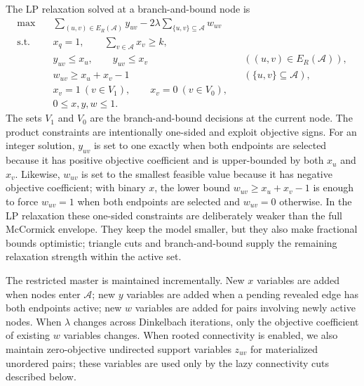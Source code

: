\documentclass[12pt]{article}
\newcommand{\A}{\mathcal{A}}
\begin{document}
The LP relaxation solved at a branch-and-bound node is
\begin{equation}
  \label{eq:rmp}
  \begin{aligned}
    \max\quad            & \sum_{(u,v)\in E_R(\A)} y_{uv}
    -2\lambda\sum_{\{u,v\}\subseteq\A} w_{uv}                                                           \\
    \text{s.t.}\quad
                         & x_q=1,
    \qquad \sum_{v\in\A}x_v\ge k,                                                                       \\
                         & y_{uv}\le x_u,
    \qquad y_{uv}\le x_v &                                & ((u,v)\in E_R(\A)),                         \\
                         & w_{uv}\ge x_u+x_v-1            &                     & (\{u,v\}\subseteq\A), \\
                         & x_v=1\ (v\in V_1),
    \qquad x_v=0\ (v\in V_0),                                                                           \\
                         & 0\le x,y,w\le 1.
  \end{aligned}
\end{equation}
The sets $V_1$ and $V_0$ are the branch-and-bound decisions at the current node.  The product constraints are intentionally one-sided and exploit objective signs.  For an integer solution, $y_{uv}$ is set to one exactly when both endpoints are selected because it has positive objective coefficient and is upper-bounded by both $x_u$ and $x_v$.  Likewise, $w_{uv}$ is set to the smallest feasible value because it has negative objective coefficient; with binary $x$, the lower bound $w_{uv}\ge x_u+x_v-1$ is enough to force $w_{uv}=1$ when both endpoints are selected and $w_{uv}=0$ otherwise.  In the LP relaxation these one-sided constraints are deliberately weaker than the full McCormick envelope.  They keep the model smaller, but they also make fractional bounds optimistic; triangle cuts and branch-and-bound supply the remaining relaxation strength within the active set.

The restricted master is maintained incrementally.  New $x$ variables are added when nodes enter $\A$; new $y$ variables are added when a pending revealed edge has both endpoints active; new $w$ variables are added for pairs involving newly active nodes.  When $\lambda$ changes across Dinkelbach iterations, only the objective coefficient of existing $w$ variables changes.  When rooted connectivity is enabled, we also maintain zero-objective undirected support variables $z_{uv}$ for materialized unordered pairs; these variables are used only by the lazy connectivity cuts described below.
\end{document}
